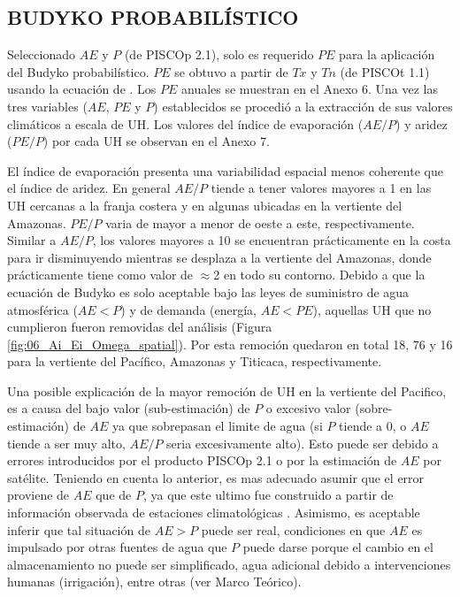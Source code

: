 \documentclass[12pt]{article}
\begin{document}
\subsection{BUDYKO PROBABILÍSTICO}

Seleccionado $AE$ y $P$ (de PISCOp 2.1), solo es requerido $PE$ para la aplicación del Budyko probabilístico. $PE$ se obtuvo a partir de $Tx$ y $Tn$ (de PISCOt 1.1) usando la ecuación de \citet{Hargreaves1985}. Los $PE$ anuales se muestran en el Anexo 6. Una vez las tres variables ($AE$, $PE$ y $P$) establecidos se procedió a la extracción de sus valores climáticos a escala de UH. Los valores del índice de evaporación ($AE/P$) y aridez ($PE/P$) por cada UH se observan en el Anexo 7. 

El índice de evaporación presenta una variabilidad espacial menos coherente que el índice de aridez. En general $AE/P$ tiende a tener valores mayores a 1 en las UH cercanas a la franja costera y en algunas ubicadas en la vertiente del Amazonas. $PE/P$ varia de mayor a menor de oeste a este, respectivamente. Similar a $AE/P$, los valores mayores a 10 se encuentran prácticamente en la costa para ir disminuyendo mientras se desplaza a la vertiente del Amazonas, donde prácticamente tiene como valor de $\approx$2 en todo su contorno. Debido a que la ecuación de Budyko es solo aceptable bajo las leyes de suministro de agua atmosférica ($AE < P$) y de demanda (energía, $AE < PE$), aquellas UH que no cumplieron fueron removidas del análisis (Figura \ref{fig:06_Ai_Ei_Omega_spatial}). Por esta remoción quedaron en total 18, 76 y 16 para la vertiente del Pacífico, Amazonas y Titicaca, respectivamente.

Una posible explicación de la mayor remoción de UH en la vertiente del Pacifico, es a causa del bajo valor (sub-estimación) de $P$ o excesivo valor (sobre-estimación) de $AE$ ya que sobrepasan el limite de agua (si $P$ tiende a 0, o $AE$ tiende a ser muy alto, $AE/P$ seria excesivamente alto). Esto puede ser debido a errores introducidos por el producto PISCOp 2.1 o por la estimación de $AE$ por satélite. Teniendo en cuenta lo anterior, es mas adecuado asumir que el error proviene de $AE$ que de $P$, ya que este ultimo fue construido a partir de información observada de estaciones climatológicas \citep{Aybar2019}. Asimismo, es aceptable inferir que tal situación de $AE > P$ puede ser real, condiciones en que $AE$ es impulsado por otras fuentes de agua que $P$ puede darse porque el cambio en el almacenamiento no puede ser simplificado, agua adicional debido a intervenciones humanas (irrigación), entre otras (ver Marco Teórico).
 
\end{document}
